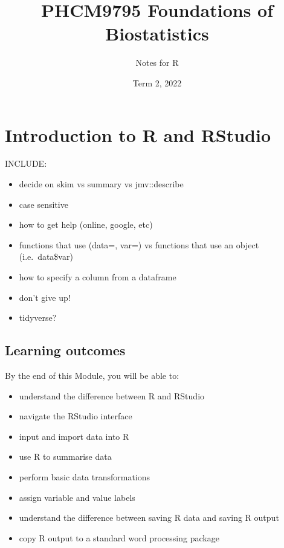 \documentclass[
]{memoir}
\title{PHCM9795 Foundations of Biostatistics}
\author{Notes for R}
\date{Term 2, 2022}
\providecommand{\tightlist}{%
  \setlength{\itemsep}{0pt}\setlength{\parskip}{0pt}}
\begin{document}
\maketitle

{
\setcounter{tocdepth}{1}
\tableofcontents
}
\hypertarget{introduction-to-r-and-rstudio}{%
\chapter{Introduction to R and RStudio}\label{introduction-to-r-and-rstudio}}

INCLUDE:

\begin{itemize}
\tightlist
\item
  decide on skim vs summary vs jmv::describe
\item
  case sensitive
\item
  how to get help (online, google, etc)
\item
  functions that use (data=, var=) vs functions that use an object (i.e.~data\$var)
\item
  how to specify a column from a dataframe
\item
  don't give up!
\item
  tidyverse?
\end{itemize}

\hypertarget{learning-outcomes}{%
\section*{Learning outcomes}\label{learning-outcomes}}

By the end of this Module, you will be able to:

\begin{itemize}
\tightlist
\item
  understand the difference between R and RStudio
\item
  navigate the RStudio interface
\item
  input and import data into R
\item
  use R to summarise data
\item
  perform basic data transformations
\item
  assign variable and value labels
\item
  understand the difference between saving R data and saving R output
\item
  copy R output to a standard word processing package
\end{itemize}
\end{document}

